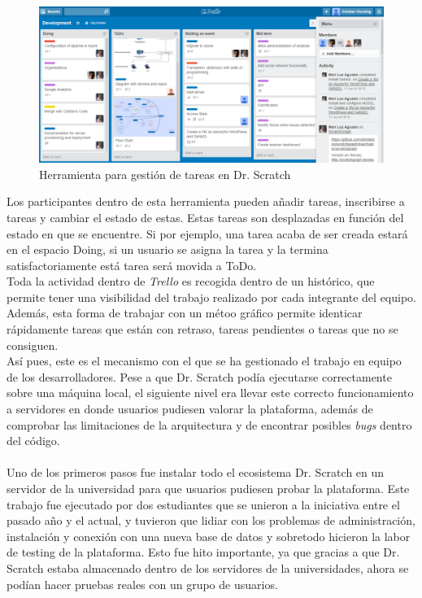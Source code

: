 \documentclass[a4paper, 12pt]{book}
\begin{document}
\begin{figure}
	\graphicspath{{img/}}
  \includegraphics[bb=0 0 800 600, width=12cm, keepaspectratio]{trello.png}
	\caption{Herramienta para gestión de tareas en Dr. Scratch}
  \label{figura:foro_hilos}
\end{figure}


Los participantes dentro de esta herramienta pueden añadir tareas, inscribirse
a tareas y cambiar el estado de estas. Estas tareas son desplazadas en función
del estado en que se encuentre. Si por ejemplo, una tarea acaba de ser creada
estará en el espacio Doing, si un usuario se asigna la tarea y la termina 
satisfactoriamente está tarea será movida a ToDo. \\

Toda la actividad dentro de \emph{Trello} es recogida dentro de un histórico,
que permite tener una visibilidad del trabajo realizado por cada integrante del
equipo. Además, esta forma de trabajar con un métoo gráfico permite identicar
rápidamente tareas que están con retraso, tareas pendientes o tareas que no
se consiguen. \\

Así pues, este es el mecanismo con el que se ha gestionado el trabajo en equipo
de los desarrolladores. Pese a que Dr. Scratch podía ejecutarse correctamente
sobre una máquina local, el siguiente nivel era llevar este correcto funcionamiento 
a servidores en donde usuarios pudiesen valorar la plataforma, además de comprobar 
las limitaciones de la arquitectura y de encontrar posibles \emph{bugs} dentro del código. \\ \\

Uno de los primeros pasos fue instalar todo el ecosistema Dr. Scratch en un servidor de 
la universidad para que usuarios pudiesen probar la plataforma. Este trabajo fue 
ejecutado por dos estudiantes que se unieron a la iniciativa entre el pasado año y el 
actual, y tuvieron que lidiar con los problemas de administración, instalación y 
conexión con una nueva base de datos y sobretodo hicieron la labor de testing de la 
plataforma. Esto fue hito importante, ya que gracias a que Dr. Scratch estaba almacenado
dentro de los servidores de la universidades, ahora se podían hacer pruebas reales
con un grupo de usuarios. \\
\end{document}
